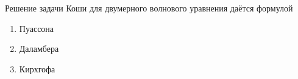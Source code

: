 Решение задачи Коши для двумерного волнового уравнения даётся формулой

\begin{enumerate}[label=\arabic*)]
    \item Пуассона
    \item Даламбера
    \item Кирхгофа
\end{enumerate}


